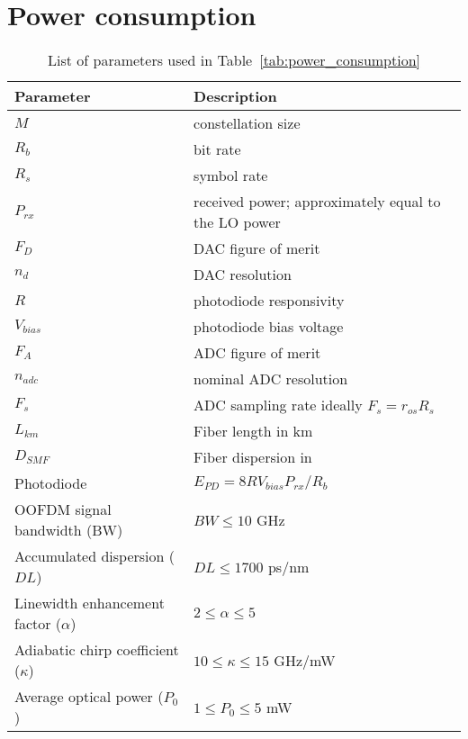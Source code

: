 \documentclass[a4paper]{article}
\begin{document}
\section{Power consumption}

\begin{table}[t]
	\caption{List of parameters used in Table~\ref{tab:power_consumption}}
	\label{tab:param}
	\centering
	\begin{tabular}{l|l}
		\hline
		Parameter & Description \\
		\hline
		$M$ & constellation size \\
		$R_b$ & bit rate \\
		$R_s$ & symbol rate \\
		$P_{rx}$ & received power; approximately equal to the LO power \\
		$F_D$  & DAC figure of merit     \\
		$n_d$ & DAC resolution \\
		$R$ & photodiode responsivity \\
		$V_{bias}$ & photodiode bias voltage \\
		$F_A$ & ADC figure of merit \\
		$n_{adc}$ & nominal ADC resolution \\
		$F_s$ & ADC sampling rate ideally $F_s = r_{os}R_s$ \\
		$L_{km}$ & Fiber length in km \\
		$D_{SMF}$ & Fiber dispersion in \\
		
		
		Photodiode & $E_{PD}=8RV_{bias}P_{rx}/R_b$ \\
		OOFDM signal bandwidth (BW) & $BW \leq 10$ GHz \\
		Accumulated dispersion ($DL$)  								& $DL \leq 1700$ ps/nm    \\
		Linewidth enhancement factor ($\alpha$)&  $2 \leq \alpha \leq 5$   \\
		Adiabatic chirp coefficient ($\kappa$)  & 	$10 \leq \kappa \leq 15$ GHz/mW     \\
		Average optical power ($P_0$)														 &  $1 \leq P_0 \leq 5$ mW \\
		\hline
	\end{tabular}
\end{table}




\end{document}
